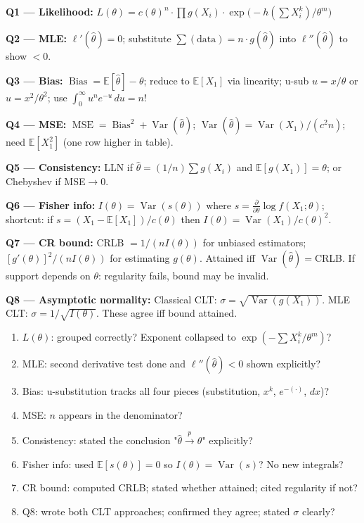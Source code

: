 \documentclass[11pt,a4paper]{article}
\newcommand{\pd}[2]{\frac{\partial #1}{\partial #2}}
\newcommand{\E}{\mathbb{E}}
\newcommand{\Var}{\operatorname{Var}}
\newcommand{\Bias}{\operatorname{Bias}}
\newcommand{\MSE}{\operatorname{MSE}}
\newcommand{\convp}{\xrightarrow{\,p\,}}
\begin{document}
\begin{tcolorbox}[formulabox]
\textbf{Q1 — Likelihood:}
$L(\theta) = c(\theta)^n \cdot \prod g(X_i) \cdot \exp\!\bigl(-h(\textstyle\sum X_i^k)/\theta^m\bigr)$

\medskip
\textbf{Q2 — MLE:}
$\ell'(\hat\theta)=0$; substitute $\sum(\text{data})=n\cdot g(\hat\theta)$ into $\ell''(\hat\theta)$ to show $<0$.

\medskip
\textbf{Q3 — Bias:}
$\Bias = \E[\hat\theta]-\theta$; reduce to $\E[X_1]$ via linearity; u-sub $u=x/\theta$ or $u=x^2/\theta^2$; use $\int_0^\infty u^n e^{-u}\,du = n!$

\medskip
\textbf{Q4 — MSE:}
$\MSE = \Bias^2 + \Var(\hat\theta)$; $\Var(\hat\theta) = \Var(X_1)/(c^2 n)$; need $\E[X_1^2]$ (one row higher in table).

\medskip
\textbf{Q5 — Consistency:}
LLN if $\hat\theta=(1/n)\sum g(X_i)$ and $\E[g(X_1)]=\theta$; or Chebyshev if MSE$\to 0$.

\medskip
\textbf{Q6 — Fisher info:}
$I(\theta)=\Var(s(\theta))$ where $s=\pd{}{\theta}\log f(X_1;\theta)$; shortcut: if $s=(X_1-\E[X_1])/c(\theta)$ then $I(\theta)=\Var(X_1)/c(\theta)^2$.

\medskip
\textbf{Q7 — CR bound:}
CRLB $= 1/(nI(\theta))$ for unbiased estimators; $[g'(\theta)]^2/(nI(\theta))$ for estimating $g(\theta)$. Attained iff $\Var(\hat\theta)=$CRLB. If support depends on $\theta$: regularity fails, bound may be invalid.

\medskip
\textbf{Q8 — Asymptotic normality:}
Classical CLT: $\sigma=\sqrt{\Var(g(X_1))}$. MLE CLT: $\sigma=1/\sqrt{I(\theta)}$. These agree iff bound attained.
\end{tcolorbox}

\bigskip

\begin{tcolorbox}[warnbox, title={Exam checklist}]
\begin{enumerate}[leftmargin=2em, itemsep=2pt]
  \item[$\square$] $L(\theta)$: grouped correctly? Exponent collapsed to $\exp(-\sum X_i^k/\theta^m)$?
  \item[$\square$] MLE: second derivative test done and $\ell''(\hat\theta) < 0$ shown explicitly?
  \item[$\square$] Bias: u-substitution tracks all four pieces (substitution, $x^k$, $e^{-(\cdot)}$, $dx$)?
  \item[$\square$] MSE: $n$ appears in the denominator?
  \item[$\square$] Consistency: stated the conclusion "$\hat\theta\convp\theta$" explicitly?
  \item[$\square$] Fisher info: used $\E[s(\theta)]=0$ so $I(\theta)=\Var(s)$? No new integrals?
  \item[$\square$] CR bound: computed CRLB; stated whether attained; cited regularity if not?
  \item[$\square$] Q8: wrote both CLT approaches; confirmed they agree; stated $\sigma$ clearly?
\end{enumerate}
\end{tcolorbox}
\end{document}
